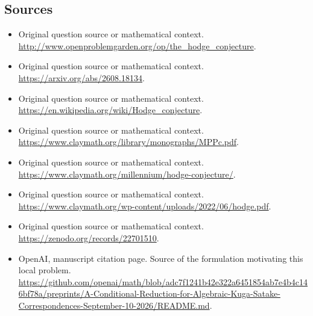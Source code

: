 \documentclass[11pt]{article}
\begin{document}
\subsection{Sources}
\begin{itemize}
\item[S1] Original question source or mathematical context.
\url{http://www.openproblemgarden.org/op/the_hodge_conjecture}.
\item[S2] Original question source or mathematical context.
\url{https://arxiv.org/abs/2608.18134}.
\item[S3] Original question source or mathematical context.
\url{https://en.wikipedia.org/wiki/Hodge_conjecture}.
\item[S4] Original question source or mathematical context.
\url{https://www.claymath.org/library/monographs/MPPc.pdf}.
\item[S5] Original question source or mathematical context.
\url{https://www.claymath.org/millennium/hodge-conjecture/}.
\item[S6] Original question source or mathematical context.
\url{https://www.claymath.org/wp-content/uploads/2022/06/hodge.pdf}.
\item[S7] Original question source or mathematical context.
\url{https://zenodo.org/records/22701510}.
\item[S8] OpenAI, manuscript citation page. Source of the formulation motivating this local problem.
\url{https://github.com/openai/math/blob/adc7f1241b42e322a6451854ab7e4b4c146bf78a/preprints/A-Conditional-Reduction-for-Algebraic-Kuga-Satake-Correspondences-September-10-2026/README.md}.
\end{itemize}
\end{document}
